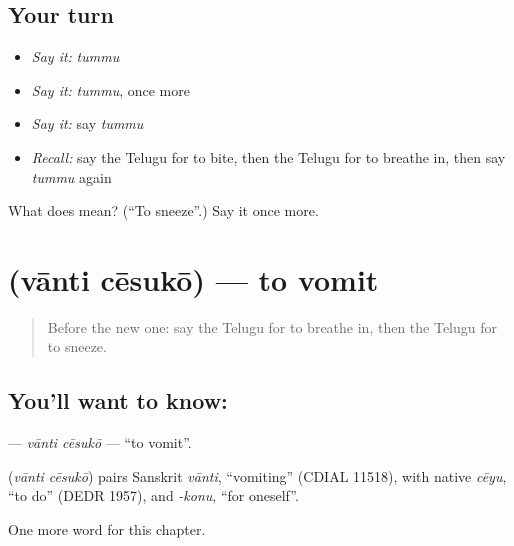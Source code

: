 \subsection*{Your turn}
\begin{itemize}
\raggedright
  \item \emph{Say it:} \emph{tummu}
  \item \emph{Say it:} \emph{tummu}, once more
  \item \emph{Say it:} say \emph{tummu}
  \item \emph{Recall:} say the Telugu for to bite, then the Telugu for to breathe in, then say \emph{tummu} again
\end{itemize}

\begin{tcolorbox}[breakable,colback=teal!4,colframe=teal!35!black,title={Before you move on}]
What does  mean? (\textquotedblleft{}To sneeze\textquotedblright{}.) Say it once more.
\end{tcolorbox}
\section[\texorpdfstring{\te{వాంతి} \te{చేసుకో} (vānti cēsukō)}{వాంతి చేసుకో (vānti cēsukō)}]{  (vānti cēsukō) — to vomit}

\label{lesson:TE-C241-vanti-cesuko}



\begin{quote}
Before the new one: say the Telugu for to breathe in, then the Telugu for to sneeze.
\end{quote}

\subsection*{You'll want to know:  }
\textbf{ } — \emph{vānti cēsukō} — \textquotedblleft{}to vomit\textquotedblright{}.

\begin{cousinweb}
\textbf{ } (\emph{vānti cēsukō}) pairs Sanskrit \emph{vānti}, \textquotedblleft{}vomiting\textquotedblright{} (CDIAL 11518), with native \emph{cēyu}, \textquotedblleft{}to do\textquotedblright{} (DEDR 1957), and \emph{-konu}, \textquotedblleft{}for oneself\textquotedblright{}.
\end{cousinweb}

\begin{grammarlens}[title={What you've built}]
One more word for this chapter.
\end{grammarlens}

